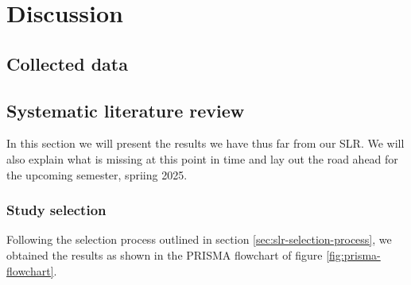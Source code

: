 \chapter{Discussion}\label{sec:discussion}

\section{Collected data}



\section{Systematic literature review}\label{sec:results-slr}
In this section we will present the results we have thus far from our SLR. We will also explain what is missing at this point in time and lay out the road ahead for the upcoming semester, spriing 2025.

\subsection{Study selection}
Following the selection process outlined in section \ref{sec:slr-selection-process}, we obtained the results as shown in the PRISMA flowchart of figure \ref{fig:prisma-flowchart}.

